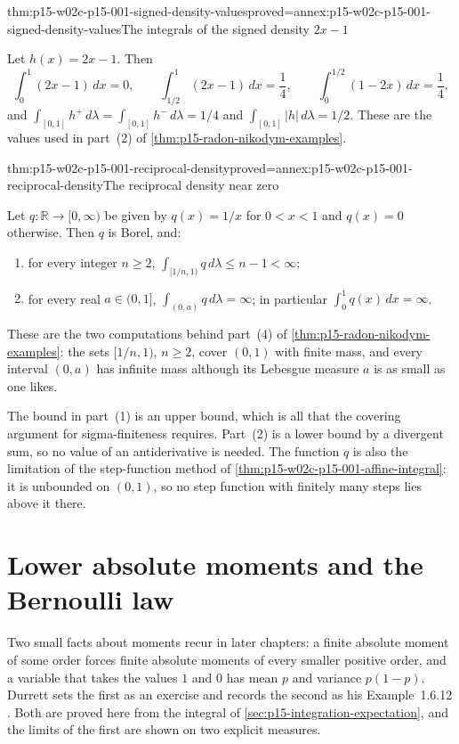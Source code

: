 \begin{hbcorollary}{thm:p15-w02c-p15-001-signed-density-values}{proved=annex:p15-w02c-p15-001-signed-density-values}{The integrals of the signed density \(2x-1\)}
\par\nobreak
Let \(h(x)=2x-1\). Then
\[
 \int_0^1(2x-1)\,dx=0,\qquad
 \int_{1/2}^1(2x-1)\,dx=\frac14,\qquad
 \int_0^{1/2}(1-2x)\,dx=\frac14 ,
\]
and
\(\int_{[0,1]}h^+\,d\lambda=\int_{[0,1]}h^-\,d\lambda=1/4\) and
\(\int_{[0,1]}|h|\,d\lambda=1/2\). These are the values used in part~(2)
of \cref{thm:p15-radon-nikodym-examples}.
\end{hbcorollary}

\begin{hbtheorem}{thm:p15-w02c-p15-001-reciprocal-density}{proved=annex:p15-w02c-p15-001-reciprocal-density}{The reciprocal density near zero}
\par\nobreak
Let \(q:\mathbb R\to[0,\infty)\) be given by \(q(x)=1/x\) for
\(0<x<1\) and \(q(x)=0\) otherwise. Then \(q\) is Borel, and:
\begin{enumerate}
\item for every integer \(n\geq2\),
      \(\int_{[1/n,1)}q\,d\lambda\leq n-1<\infty\);
\item for every real \(a\in(0,1]\),
      \(\int_{(0,a)}q\,d\lambda=\infty\); in particular
      \(\int_0^1q(x)\,dx=\infty\).
\end{enumerate}
These are the two computations behind part~(4) of
\cref{thm:p15-radon-nikodym-examples}: the sets \([1/n,1)\), \(n\geq2\),
cover \((0,1)\) with finite mass, and every interval \((0,a)\) has
infinite mass although its Lebesgue measure \(a\) is as small as one
likes.
\end{hbtheorem}

The bound in part~(1) is an upper bound, which is all that the covering
argument for sigma-finiteness requires. Part~(2) is a lower bound by a
divergent sum, so no value of an antiderivative is needed. The function
\(q\) is also the limitation of the step-function method of
\cref{thm:p15-w02c-p15-001-affine-integral}: it is unbounded on \((0,1)\),
so no step function with finitely many steps lies above it there.

\section{Lower absolute moments and the Bernoulli law}
\label{sec:p15-w02c-p15-001-lower-moments}

Two small facts about moments recur in later chapters: a finite absolute
moment of some order forces finite absolute moments of every smaller
positive order, and a variable that takes the values \(1\) and \(0\) has
mean \(p\) and variance \(p(1-p)\). Durrett sets the first as an exercise
\cite[exercise~1.6.11, p.~37]{DurrettPTEAuthor2019} and records the
second as his Example~1.6.12
\cite[example~1.6.12, p.~34]{DurrettPTEAuthor2019}. Both are proved here
from the integral of \cref{sec:p15-integration-expectation}, and the
limits of the first are shown on two explicit measures.

